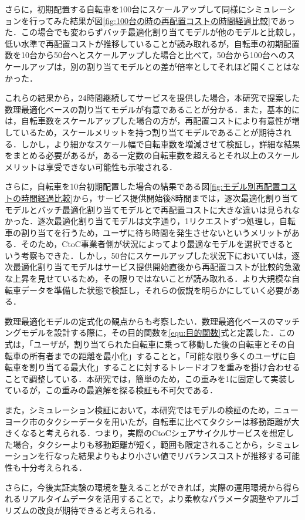       \par さらに，初期配置する自転車を100台にスケールアップして同様にシミュレーションを行ってみた結果が図\ref{fig:100台の時の再配置コストの時間経過比較}であった．この場合でも変わらずバッチ最適化割り当てモデルが他のモデルと比較し，低い水準で再配置コストが推移していることが読み取れるが，自転車の初期配置数を10台から50台へとスケールアップした場合と比べて，50台から100台へのスケールアップは，別の割り当てモデルとの差が倍率としてそれほど開くことはなかった．
      \par これらの結果から，24時間継続してサービスを提供した場合，本研究で提案した数理最適化ベースの割り当てモデルが有意であることが分かる．また，基本的には，自転車数をスケールアップした場合の方が，再配置コストにより有意性が増しているため，スケールメリットを持つ割り当てモデルであることが期待される．しかし，より細かなスケール幅で自転車数を増減させて検証し，詳細な結果をまとめる必要があるが，ある一定数の自転車数を超えるとそれ以上のスケールメリットは享受できない可能性も示唆される．
      \par さらに，自転車を10台初期配置した場合の結果である図\ref{fig:モデル別再配置コストの時間経過比較}から，サービス提供開始後8時間までは，逐次最適化割り当てモデルとバッチ最適化割り当てモデルとで再配置コストに大きな違いは見られなかった．逐次最適化割り当てモデルは文字通り，1リクエストずつ処理し，自転車の割り当てを行うため，ユーザに待ち時間を発生させないというメリットがある．そのため，CtoC事業者側が状況によってより最適なモデルを選択できるという考察もできた．しかし，50台にスケールアップした状況下においていは，逐次最適化割り当てモデルはサービス提供開始直後から再配置コストが比較的急激な上昇を見せているため，その限りではないことが読み取れる．より大規模な自転車データを準備した状態で検証し，それらの仮説を明らかにしていく必要がある．
      \par 数理最適化モデルの定式化の観点からも考察したい．数理最適化ベースのマッチングモデルを設計する際に，その目的関数を\ref{equ:目的関数}式と定義した．この式は，「ユーザが，割り当てられた自転車に乗って移動した後の自転車とその自転車の所有者までの距離を最小化」することと，「可能な限り多くのユーザに自転車を割り当てる最大化」することに対するトレードオフを重みを掛け合わせることで調整している．本研究では，簡単のため，この重みを1に固定して実装しているが，この重みの最適解を探る検証も不可欠である．
      \par また，シミュレーション検証において，本研究ではモデルの検証のため，ニューヨーク市のタクシーデータを用いたが，自転車に比べてタクシーは移動距離が大きくなると考えられる．つまり，実際のCtoCシェアサイクルサービスを想定した場合，タクシーよりも移動距離が短く，範囲も限定されることから，シミュレーションを行なった結果よりもより小さい値でリバランスコストが推移する可能性も十分考えられる．
      \par さらに，今後実証実験の環境を整えることができれば，実際の運用環境から得られるリアルタイムデータを活用することで，より柔軟なパラメータ調整やアルゴリズムの改良が期待できると考えられる．
      
